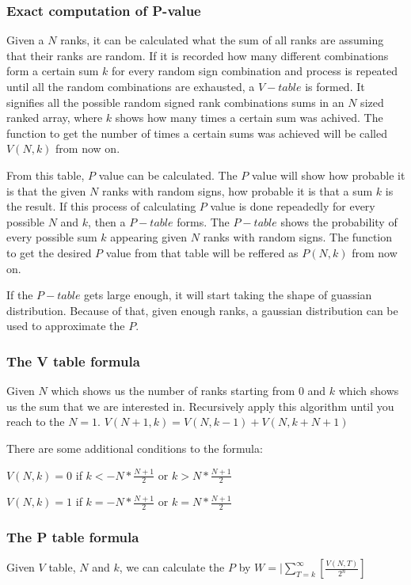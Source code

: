 \documentclass[12pt]{article}
\begin{document}
\subsubsection{Exact computation of P-value}

Given a $N$ ranks, it can be calculated what the sum of all ranks are assuming that their ranks are random. If it is recorded how many different combinations form a certain sum $k$ for every random sign combination and process is repeated until all the random combinations are exhausted, a $V-table$ is formed. It signifies all the possible random signed rank combinations sums in an $N$ sized ranked array, where $k$ shows how many times a certain sum was achived. The function to get the number of times a certain sums was achieved will be called $V(N, k)$ from now on.

From this table, $P$ value can be calculated. The $P$ value will show how probable it is that the given $N$ ranks with random signs, how probable it is that a sum $k$ is the result. If this process of calculating $P$ value is done repeadedly for every possible $N$ and $k$, then a $P-table$ forms. The $P-table$ shows the probability of every possible sum $k$ appearing given $N$ ranks with random signs. The function to get the desired $P$ value from that table will be reffered as $P(N, k)$ from now on.

If the $P-table$ gets large enough, it will start taking the shape of guassian distribution. Because of that, given enough ranks, a gaussian distribution can be used to approximate the $P$.

\subsubsection{The V table formula}

Given $N$ which shows us the number of ranks starting from $0$ and $k$ which shows us the sum that we are interested in. Recursively apply this algorithm until you reach to the $N = 1$.
$V(N+1, k) = V(N, k-1) + V(N, k+N+1)$

There are some additional conditions to the formula:

$V(N, k) = 0$ if $k < -N * \frac{N+1}{2}$ or $k > N * \frac{N+1}{2}$

$V(N, k) = 1$ if $k = -N * \frac{N+1}{2}$ or $k = N * \frac{N+1}{2}$

\subsubsection{The P table formula}
Given $V$ table, $N$ and $k$, we can calculate the $P$ by
$W=|\sum\limits_{T = k}^{\infty}[\frac{V(N, T)}{2^n}]$
\end{document}
